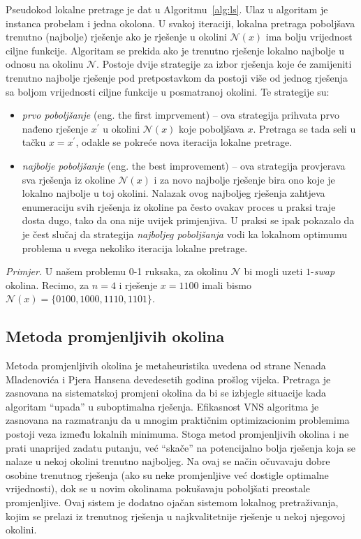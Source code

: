 \documentclass[a4paper, utf8, 11pt, colorlinks]{book}
\begin{document}
Pseudokod lokalne pretrage je dat u Algoritmu~\ref{alg:ls}. Ulaz u algoritam je instanca probelam i jedna okolona. U svakoj iteraciji, lokalna pretraga poboljšava trenutno (najbolje) rješenje ako je rješenje u okolini  $\mathcal{N}(x)$ ima bolju vrijednost ciljne funkcije. Algoritam se prekida ako je trenutno rješenje lokalno najbolje u odnosu na okolinu   $\mathcal{N}$.
 Postoje dvije strategije za izbor rješenja koje će zamijeniti trenutno najbolje rješenje pod pretpostavkom da postoji više od jednog rješenja sa boljom vrijednosti ciljne funkcije u posmatranoj okolini. Te strategije su:
 \begin{itemize}
 	\item \emph{prvo poboljšanje} (eng. the first imprvement) -- ova strategija prihvata prvo nađeno rješenje $x^{'}$ u okolini $\mathcal{N}(x)$ koje poboljšava $x$. Pretraga se tada seli u tačku  $x = x^{'}$, odakle se pokreće nova iteracija lokalne pretrage.
 	\item \emph{najbolje poboljšanje} (eng. the best improvement) --   ova strategija provjerava sva rješenja iz okoline $\mathcal{N}(x)$ i za novo najbolje rješenje bira ono koje je lokalno najbolje u toj okolini. Nalazak ovog  najboljeg rješenja zahtjeva enumeraciju svih rješenja iz okoline pa često ovakav proces u praksi traje dosta dugo,  tako da ona nije uvijek primjenjiva. U praksi se ipak pokazalo da  je čest slučaj da strategija \emph{najboljeg poboljšanja} vodi ka lokalnom optimumu problema u svega nekoliko iteracija lokalne pretrage. 
 \end{itemize}
  
  \emph{Primjer.} U našem problemu 0-1 ruksaka, za okolinu $\mathcal{N}$ bi mogli uzeti $1$-\emph{swap} okolina. Recimo, za $n=4$ i rješenje $x=1100$ imali  bismo $\mathcal{N}(x)= \{ 0100, 1000, 1110, 1101 \}$. 
  
\subsection{Metoda promjenljivih okolina}\label{intro:vns}
Metoda promjenljivih okolina je metaheuristika uvedena od strane Nenada Mladenovića i Pjera Hansena devedesetih godina prošlog vijeka.
Pretraga je zasnovana na sistematskoj promjeni okolina da bi se izbjegle situacije kada algoritam ``upada'' u suboptimalna rješenja. Efikasnost VNS algoritma je zasnovana na razmatranju da u mnogim praktičnim optimizacionim problemima postoji veza između lokalnih minimuma. Stoga metod promjenljivih okolina i ne prati unaprijed zadatu putanju, već ``skače'' na potencijalno bolja rješenja koja se nalaze u nekoj okolini trenutno najboljeg.
Na ovaj se način očuvavaju dobre osobine trenutnog rješenja (ako su neke promjenljive već dostigle optimalne vrijednosti), dok se u novim okolinama pokušavaju poboljšati preostale promjenljive. Ovaj sistem je dodatno ojačan sistemom lokalnog pretraživanja, kojim se prelazi iz trenutnog rješenja u najkvalitetnije rješenje u nekoj njegovoj okolini.
\end{document}
